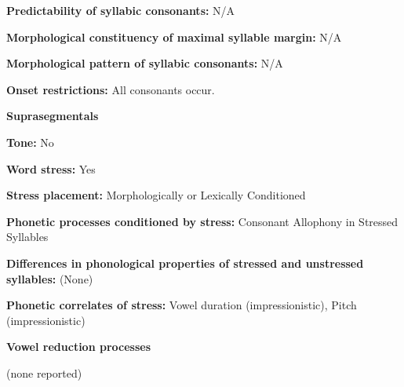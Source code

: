 \begin{styleBody}
\textbf{Predictability of syllabic consonants:} N/A
\end{styleBody}

\begin{styleBody}
\textbf{Morphological constituency of maximal syllable margin:} N/A
\end{styleBody}

\begin{styleBody}
\textbf{Morphological pattern of syllabic consonants:} N/A
\end{styleBody}

\begin{styleBody}
\textbf{Onset restrictions: }All consonants occur.
\end{styleBody}

\begin{styleBody}
\textbf{Suprasegmentals}
\end{styleBody}

\begin{styleBody}
\textbf{Tone:} No
\end{styleBody}

\begin{styleBody}
\textbf{Word stress:} Yes
\end{styleBody}

\begin{styleBody}
\textbf{Stress placement:} Morphologically or Lexically Conditioned
\end{styleBody}

\begin{styleBody}
\textbf{Phonetic processes conditioned by stress:} Consonant Allophony in Stressed Syllables
\end{styleBody}

\begin{styleBody}
\textbf{Differences in phonological properties of stressed and unstressed syllables:} (None) 
\end{styleBody}

\begin{styleBody}
\textbf{Phonetic correlates of stress: }Vowel duration (impressionistic), Pitch (impressionistic)
\end{styleBody}

\begin{styleBody}
\textbf{Vowel reduction processes}
\end{styleBody}

\begin{styleBody}
(none reported)
\end{styleBody}

